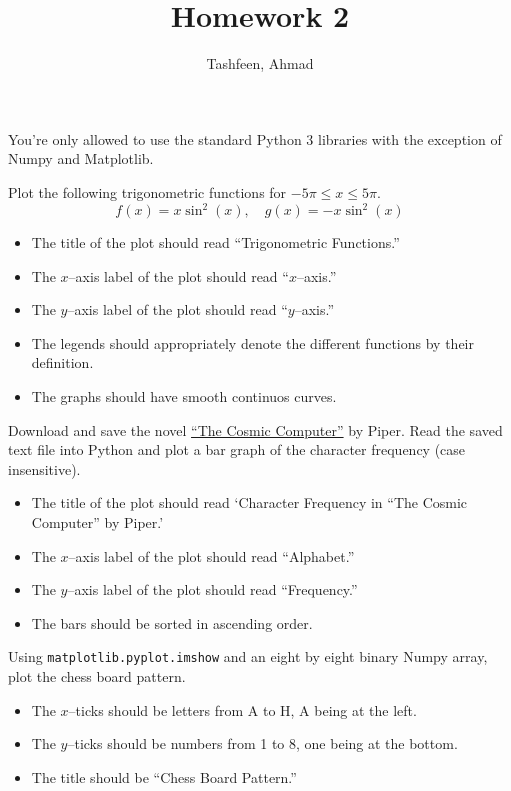 \documentclass{homework}
\author{Tashfeen, Ahmad}
\title{Homework 2}
\begin{document}
 \maketitle

You're only allowed to use the standard Python 3 libraries with the exception of Numpy and Matplotlib.

\question Plot the following trigonometric functions for $-5\pi \leq x \leq 5\pi$.
\[
      f(x) = x\sin^2(x), \quad  g(x) = -x\sin^2(x)
\]
\begin{itemize}
    \item The title of the plot should read ``Trigonometric Functions.''
    \item The $x$--axis label of the plot should read ``$x$--axis.''
    \item The $y$--axis label of the plot should read ``$y$--axis.''
    \item The legends should appropriately denote the different functions by their definition.
    \item The graphs should have smooth continuos curves.
\end{itemize}

\question Download and save the novel
\href{https://www.gutenberg.org/files/20727/20727.txt}{``The Cosmic
  Computer''} by Piper. Read the saved text file into Python and plot
a bar graph of the character frequency (case insensitive).

\begin{itemize}
    \item The title of the plot should read `Character Frequency in ``The Cosmic Computer'' by Piper.'
    \item The $x$--axis label of the plot should read ``Alphabet.''
    \item The $y$--axis label of the plot should read ``Frequency.''
    \item The bars should be sorted in ascending order.
\end{itemize}

\question Using \texttt{matplotlib.pyplot.imshow} and an eight by eight binary Numpy array, plot the chess board pattern.

\begin{itemize}
    \item The $x$--ticks should be letters from A to H, A being at the left.
    \item The $y$--ticks should be numbers from 1 to 8, one being at the bottom.
    \item The title should be ``Chess Board Pattern.''
\end{itemize}
\end{document}
